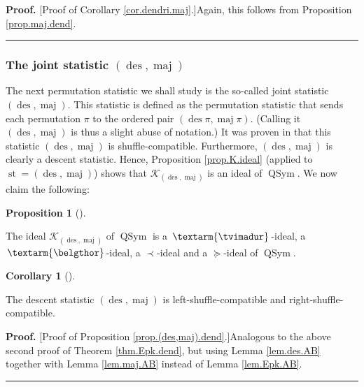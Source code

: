 \documentclass[numbers=enddot,12pt,final,onecolumn,notitlepage]{scrartcl}%
\theoremstyle{definition}
\newtheorem{prop}[theo]{Proposition}
\newenvironment{proposition}[1][]
{\begin{prop}[#1]\begin{leftbar}}
{\end{leftbar}\end{prop}}
\newtheorem{coro}[theo]{Corollary}
\newenvironment{corollary}[1][]
{\begin{coro}[#1]\begin{leftbar}}
{\end{leftbar}\end{coro}}
\newenvironment{proof}[1][Proof]{\noindent\textbf{#1.} }{\ \rule{0.5em}{0.5em}}
\newenvironment{verlong}{}{}
\newcommand{\tvi}{\left. \textarm{\tvimadur} \right.}
\newcommand{\bel}{\left. \textarm{\belgthor} \right.}
\begin{document}
\begin{verlong}
\begin{proof}
[Proof of Corollary \ref{cor.dendri.maj}.]Again, this follows from Proposition
\ref{prop.maj.dend}.
\end{proof}

\subsubsection{The joint statistic $\left(  \operatorname*{des}%
,\operatorname*{maj}\right)  $}

The next permutation statistic we shall study is the so-called joint statistic
$\left(  \operatorname*{des},\operatorname*{maj}\right)  $. This statistic is
defined as the permutation statistic that sends each permutation $\pi$ to the
ordered pair $\left(  \operatorname*{des}\pi,\operatorname*{maj}\pi\right)  $.
(Calling it $\left(  \operatorname*{des},\operatorname*{maj}\right)  $ is thus
a slight abuse of notation.) It was proven in \cite[Theorem 4.5 \textbf{(a)}%
]{part1} that this statistic $\left(  \operatorname*{des},\operatorname*{maj}%
\right)  $ is shuffle-compatible. Furthermore, $\left(  \operatorname*{des}%
,\operatorname*{maj}\right)  $ is clearly a descent statistic. Hence,
Proposition \ref{prop.K.ideal} (applied to $\operatorname*{st}=\left(
\operatorname*{des},\operatorname*{maj}\right)  $) shows that $\mathcal{K}%
_{\left(  \operatorname*{des},\operatorname*{maj}\right)  }$ is an ideal of
$\operatorname*{QSym}$. We now claim the following:

\begin{proposition}
\label{prop.(des,maj).dend}The ideal $\mathcal{K}_{\left(  \operatorname*{des}%
,\operatorname*{maj}\right)  }$ of $\operatorname*{QSym}$ is a $\tvi$-ideal, a
$\bel$-ideal, a $\left.  \prec\right.  $-ideal and a $\left.  \succeq\right.
$-ideal of $\operatorname*{QSym}$.
\end{proposition}

\begin{corollary}
\label{cor.dendri.(des,maj)}The descent statistic $\left(  \operatorname*{des}%
,\operatorname*{maj}\right)  $ is left-shuffle-compatible and right-shuffle-compatible.
\end{corollary}

\begin{proof}
[Proof of Proposition \ref{prop.(des,maj).dend}.]Analogous to the above second
proof of Theorem \ref{thm.Epk.dend}, but using Lemma \ref{lem.des.AB} together
with Lemma \ref{lem.maj.AB} instead of Lemma \ref{lem.Epk.AB}.
\end{proof}


\end{verlong}
\end{document}
